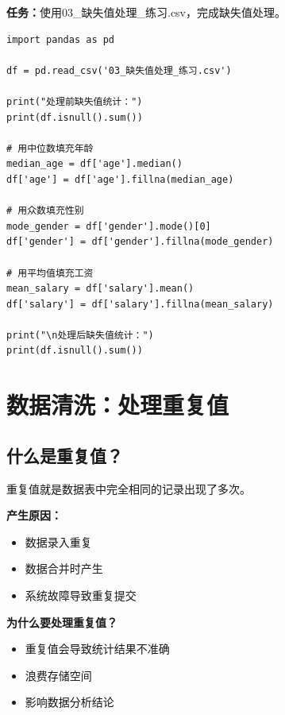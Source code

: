 \documentclass[12pt,a4paper]{article}
\begin{document}
\begin{practicebox}
\textbf{任务：}使用03\_缺失值处理\_练习.csv，完成缺失值处理。

\begin{lstlisting}
import pandas as pd

df = pd.read_csv('03_缺失值处理_练习.csv')

print("处理前缺失值统计：")
print(df.isnull().sum())

# 用中位数填充年龄
median_age = df['age'].median()
df['age'] = df['age'].fillna(median_age)

# 用众数填充性别
mode_gender = df['gender'].mode()[0]
df['gender'] = df['gender'].fillna(mode_gender)

# 用平均值填充工资
mean_salary = df['salary'].mean()
df['salary'] = df['salary'].fillna(mean_salary)

print("\n处理后缺失值统计：")
print(df.isnull().sum())
\end{lstlisting}
\end{practicebox}

\section{数据清洗：处理重复值}

\subsection{什么是重复值？}

\begin{knowledgebox}[重复值介绍]
重复值就是数据表中完全相同的记录出现了多次。

\textbf{产生原因：}
\begin{itemize}
    \item 数据录入重复
    \item 数据合并时产生
    \item 系统故障导致重复提交
\end{itemize}

\textbf{为什么要处理重复值？}
\begin{itemize}
    \item 重复值会导致统计结果不准确
    \item 浪费存储空间
    \item 影响数据分析结论
\end{itemize}
\end{knowledgebox}
\end{document}
